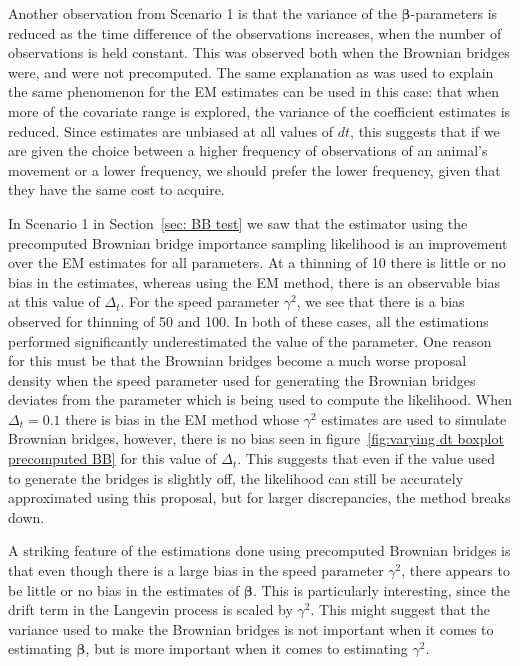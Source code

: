 Another observation from Scenario 1 is that the variance of the $\bm \beta$-parameters is reduced as the time difference of the observations increases, when the number of observations is held constant. This was observed both when the Brownian bridges were, and were not precomputed. The same explanation as was used to explain the same phenomenon for the EM estimates can be used in this case: that when more of the covariate range is explored, the variance of the coefficient estimates is reduced. Since estimates are unbiased at all values of $dt$, this suggests that if we are given the choice between a higher frequency of observations of an animal's movement or a lower frequency, we should prefer the lower frequency, given that they have the same cost to acquire.


In Scenario 1 in Section~\ref{sec: BB test} we saw that the estimator using the precomputed Brownian bridge importance sampling likelihood is an improvement over the EM estimates for all parameters. At a thinning of 10 there is little or no bias in the estimates, whereas using the EM method, there is an observable bias at this value of $\Delta_t$. For the speed parameter $\gamma^2$, we see that there is a bias observed for thinning of 50 and 100. In both of these cases, all the estimations performed significantly underestimated the value of the parameter. One reason for this must be that the Brownian bridges become a much worse proposal density when the speed parameter used for generating the Brownian bridges deviates from the parameter which is being used to compute the likelihood. 
When $\Delta_t=0.1$ there is bias in the EM method whose $\gamma^2$ estimates are used to simulate Brownian bridges, however, there is no bias seen in figure~\ref{fig:varying dt boxplot precomputed BB} for this value of $\Delta_t$. This suggests that even if the value used to generate the bridges is slightly off, the likelihood can still be accurately approximated using this proposal, but for larger discrepancies, the method breaks down. 



A striking feature of the estimations done using precomputed Brownian bridges is that even though there is a large bias in the speed parameter $\gamma^2$, there appears to be little or no bias in the estimates of $\bm \beta$. This is particularly interesting, since the drift term in the Langevin process is scaled by $\gamma^2$. This might suggest that the variance used to make the Brownian bridges is not important when it comes to estimating $\bm \beta$, but is more important when it comes to estimating $\gamma^2$. 




